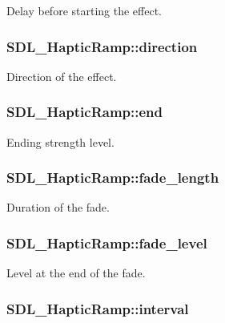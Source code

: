 Delay before starting the effect. \hypertarget{struct_s_d_l___haptic_ramp_a6fb6c67ccf262b8f3ec08bcdf08f9965}{
\subsubsection[{direction}]{ S\-D\-L\-\_\-\-Haptic\-Ramp\-::direction}}\label{struct_s_d_l___haptic_ramp_a6fb6c67ccf262b8f3ec08bcdf08f9965}
Direction of the effect. \hypertarget{struct_s_d_l___haptic_ramp_a16dd3ee307795248e21ee45ba8fb4c6c}{
\subsubsection[{end}]{ S\-D\-L\-\_\-\-Haptic\-Ramp\-::end}}\label{struct_s_d_l___haptic_ramp_a16dd3ee307795248e21ee45ba8fb4c6c}
Ending strength level. \hypertarget{struct_s_d_l___haptic_ramp_ad58a8f7cfdf659b45f0503fc56db7436}{
\subsubsection[{fade\-\_\-length}]{ S\-D\-L\-\_\-\-Haptic\-Ramp\-::fade\-\_\-length}}\label{struct_s_d_l___haptic_ramp_ad58a8f7cfdf659b45f0503fc56db7436}
Duration of the fade. \hypertarget{struct_s_d_l___haptic_ramp_a66b586f2e6a23a085a7b2854f61752c5}{
\subsubsection[{fade\-\_\-level}]{ S\-D\-L\-\_\-\-Haptic\-Ramp\-::fade\-\_\-level}}\label{struct_s_d_l___haptic_ramp_a66b586f2e6a23a085a7b2854f61752c5}
Level at the end of the fade. \hypertarget{struct_s_d_l___haptic_ramp_a4b89d108cfa7e96ea58b58771334c33d}{
\subsubsection[{interval}]{ S\-D\-L\-\_\-\-Haptic\-Ramp\-::interval}}\label{struct_s_d_l___haptic_ramp_a4b89d108cfa7e96ea58b58771334c33d}

